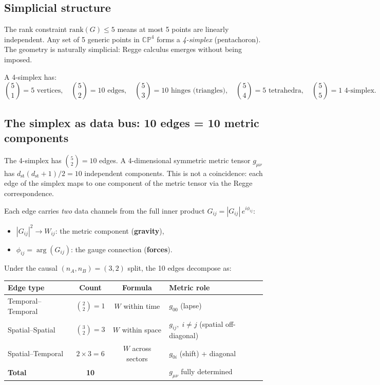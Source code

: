 \documentclass[12pt]{article}
\theoremstyle{remark}
\theoremstyle{definition}
\begin{document}
\subsection{Simplicial structure}
\label{sec:simplex}

The rank constraint $\text{rank}(G) \leq 5$ means at most 5 points are linearly independent. Any set of 5 generic points in $\mathbb{CP}^4$ forms a \emph{4-simplex} (pentachoron). The geometry is naturally simplicial: Regge calculus emerges without being imposed.

A 4-simplex has:
\begin{equation}
\binom{5}{1} = 5 \text{ vertices}, \quad
\binom{5}{2} = 10 \text{ edges}, \quad
\binom{5}{3} = 10 \text{ hinges (triangles)}, \quad
\binom{5}{4} = 5 \text{ tetrahedra}, \quad
\binom{5}{5} = 1 \text{ 4-simplex}.
\end{equation}

\subsection{The simplex as data bus: 10 edges = 10 metric components}
\label{sec:data_bus}

The 4-simplex has $\binom{5}{2} = 10$ edges. A 4-dimensional symmetric metric tensor $g_{\mu\nu}$ has $d_\text{st}(d_\text{st}+1)/2 = 10$ independent components. This is not a coincidence: each edge of the simplex maps to one component of the metric tensor via the Regge correspondence.

Each edge carries \emph{two} data channels from the full inner product $G_{ij} = |G_{ij}|\,e^{i\phi_{ij}}$:
\begin{itemize}
\item $|G_{ij}|^2 \to W_{ij}$: the metric component (\textbf{gravity}),
\item $\phi_{ij} = \arg(G_{ij})$: the gauge connection (\textbf{forces}).
\end{itemize}

Under the causal $(n_A, n_B) = (3, 2)$ split, the 10 edges decompose as:

\begin{center}
\begin{tabular}{lccl}
\hline
Edge type & Count & Formula & Metric role \\
\hline
Temporal--Temporal & $\binom{2}{2} = 1$ & $W$ within time & $g_{00}$ (lapse) \\
Spatial--Spatial & $\binom{3}{2} = 3$ & $W$ within space & $g_{ij},\;i\neq j$ (spatial off-diagonal) \\
Spatial--Temporal & $2\times 3 = 6$ & $W$ across sectors & $g_{0i}$ (shift) + diagonal \\
\hline
\textbf{Total} & \textbf{10} & & $g_{\mu\nu}$ fully determined \\
\hline
\end{tabular}
\end{center}
\end{document}

